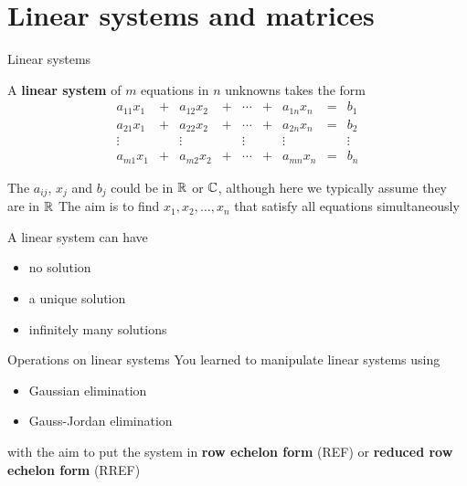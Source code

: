 \documentclass[aspectratio=169]{beamer}
\begin{document}
\section{Linear systems and matrices}


\begin{frame}{Linear systems}
\begin{definition}
	A \textbf{linear system} of $m$ equations in $n$ unknowns takes the form
	\begin{equation}\label{sys:linear_system}
	\begin{matrix}
	a_{11}x_1 &+& a_{12}x_2 &+& \cdots &+& a_{1n}x_n &=& b_1 \\
	a_{21}x_1 &+& a_{22}x_2 &+& \cdots &+& a_{2n}x_n &=& b_2 \\
	\vdots && \vdots && \vdots && \vdots && \vdots \\
	a_{m1}x_1 &+& a_{m2}x_2 &+& \cdots &+& a_{mn}x_n &=& b_n
	\end{matrix}
	\end{equation}
\end{definition}
The $a_{ij}$, $x_j$ and $b_j$ could be in $\mathbb{R}$ or $\mathbb{C}$, although here we typically assume they are in $\mathbb{R}$
\vfill
The aim is to find $x_1,x_2,\ldots,x_n$ that satisfy all equations simultaneously
\end{frame}

\begin{frame}
\begin{importanttheorem}
\label{th:nature_solutions_linear_system}
A linear system can have
\begin{itemize}
	\item no solution
	\item a unique solution
	\item infinitely many solutions
\end{itemize}
\end{importanttheorem}
\end{frame}


\begin{frame}{Operations on linear systems}
You learned to manipulate linear systems using
\begin{itemize}
	\item Gaussian elimination
	\item Gauss-Jordan elimination
\end{itemize}
with the aim to put the system in \textbf{row echelon form} (REF) or \textbf{reduced row echelon form} (RREF) 
\end{frame}
\end{document}
